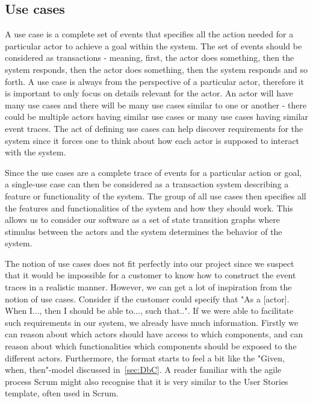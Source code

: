 \subsection{Use cases}
A use case is a complete set of events that specifies all the action needed for a particular actor to achieve a goal within the system. 
The set of events should be considered as transactions - meaning, first, the actor does something, then the system responds, then the actor does something, then the system responds and so forth. 
A use case is always from the perspective of a particular actor, therefore it is important to only focus on details relevant for the actor. 
An actor will have many use cases and there will be many use cases similar to one or another - there could be multiple actors having similar use cases or many use cases having similar event traces. 
The act of defining use cases can help discover requirements for the system since it forces one to think about how each actor is supposed to interact with the system.

Since the use cases are a complete trace of events for a particular action or goal, a single-use case can then be considered as a transaction system describing a feature or functionality of the system. 
The group of all use cases then specifies all the features and functionalities of the system and how they should work. 
This allows us to consider our software as a set of state transition graphs where stimulus between the actors and the system determines the behavior of the system.

The notion of use cases does not fit perfectly into our project since we suspect that it would be impossible for a customer to know how to construct the event traces in a realistic manner. 
However, we can get a lot of inspiration from the notion of use cases. 
Consider if the customer could specify that "As a [actor]. When I..., then I should be able to..., such that..".
If we were able to facilitate such requirements in our system, we already have much information.
Firstly we can reason about which actors should have access to which components, and can reason about which functionalities which components should be exposed to the different actors.
Furthermore, the format starts to feel a bit like the "Given, when, then"-model discussed in~\autoref{sec:DbC}.
A reader familiar with the agile process Scrum might also recognise that it is very similar to the User Stories template, often used in Scrum.
